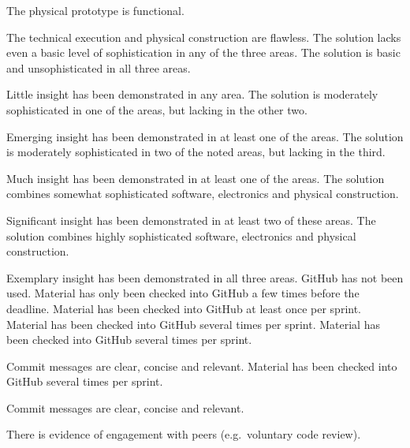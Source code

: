 \documentclass{../fal_assignment}
\begin{document}
\begin{markingrubric}
        \grade The physical prototype is functional.
            \par The technical execution and physical construction are flawless.
        \grade\fail The solution lacks even a basic level of sophistication in any of the three areas.
        \grade The solution is basic and unsophisticated in all three areas.
            \par Little insight has been demonstrated in any area.
        \grade The solution is moderately sophisticated in one of the areas, but lacking in the other two.
            \par Emerging insight has been demonstrated in at least one of the areas.
        \grade The solution is moderately sophisticated in two of the noted areas, but lacking in the third.
            \par Much insight has been demonstrated in at least one of the areas.
        \grade The solution combines somewhat sophisticated software, electronics and physical construction.
            \par Significant insight has been demonstrated in at least two of these areas.
        \grade The solution combines highly sophisticated software, electronics and physical construction.
            \par Exemplary insight has been demonstrated in all three areas.
        \grade\fail GitHub has not been used.
        \grade Material has only been checked into GitHub a few times before the deadline.
        \grade Material has been checked into GitHub at least once per sprint.
        \grade Material has been checked into GitHub several times per sprint.
        \grade Material has been checked into GitHub several times per sprint.
            \par Commit messages are clear, concise and relevant.
        \grade Material has been checked into GitHub several times per sprint.
            \par Commit messages are clear, concise and relevant.
            \par There is evidence of engagement with peers (e.g.\ voluntary code review).
\end{markingrubric}
\end{document}
